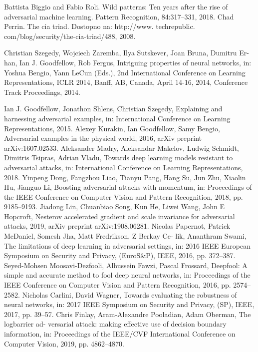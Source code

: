 \documentclass[10pt, conference, a4paper, final]{IEEEtran}
\begin{document}



\begin{thebibliography}{01}
Battista Biggio and Fabio Roli. Wild patterns: Ten years after the rise of adversarial machine learning. Pattern Recognition, 84:317–331, 2018.
Chad Perrin. The cia triad. Dostopno na: http://www. techrepublic. com/blog/security/the-cia-triad/488, 2008.

   Christian Szegedy, Wojciech Zaremba, Ilya Sutskever, Joan Bruna, Dumitru Er- han, Ian J. Goodfellow, Rob Fergus, Intriguing properties of neural networks, in: Yoshua Bengio, Yann LeCun (Eds.), 2nd International Conference on Learning Representations, ICLR 2014, Banff, AB, Canada, April 14-16, 2014, Conference Track Proceedings, 2014.
    
   Ian J. Goodfellow, Jonathon Shlens, Christian Szegedy, Explaining and harnessing adversarial examples, in: International Conference on Learning Representations, 2015.
   Alexey Kurakin, Ian Goodfellow, Samy Bengio, Adversarial examples in the physical world, 2016, arXiv preprint arXiv:1607.02533.
Aleksander Madry, Aleksandar Makelov, Ludwig Schmidt, Dimitris Tsipras, Adrian Vladu, Towards deep learning models resistant to adversarial attacks, in: International Conference on Learning Representations, 2018.
Yinpeng Dong, Fangzhou Liao, Tianyu Pang, Hang Su, Jun Zhu, Xiaolin Hu, Jianguo Li, Boosting adversarial attacks with momentum, in: Proceedings of the IEEE Conference on Computer Vision and Pattern Recognition, 2018, pp. 9185–9193.
Jiadong Lin, Chuanbiao Song, Kun He, Liwei Wang, John E Hopcroft, Nesterov accelerated gradient and scale invariance for adversarial attacks, 2019, arXiv preprint arXiv:1908.06281.
Nicolas Papernot, Patrick McDaniel, Somesh Jha, Matt Fredrikson, Z Berkay Ce- lik, Ananthram Swami, The limitations of deep learning in adversarial settings, in: 2016 IEEE European Symposium on Security and Privacy, (EuroS\&P), IEEE, 2016, pp. 372–387.
Seyed-Mohsen Moosavi-Dezfooli, Alhussein Fawzi, Pascal Frossard, Deepfool: A simple and accurate method to fool deep neural networks, in: Proceedings of the IEEE Conference on Computer Vision and Pattern Recognition, 2016, pp. 2574–2582.
Nicholas Carlini, David Wagner, Towards evaluating the robustness of neural networks, in: 2017 IEEE Symposium on Security and Privacy, (SP), IEEE, 2017, pp. 39–57.
Chris Finlay, Aram-Alexandre Pooladian, Adam Oberman, The logbarrier ad- versarial attack: making effective use of decision boundary information, in: Proceedings of the IEEE/CVF International Conference on Computer Vision, 2019, pp. 4862–4870.

\end{thebibliography}
\end{document}

